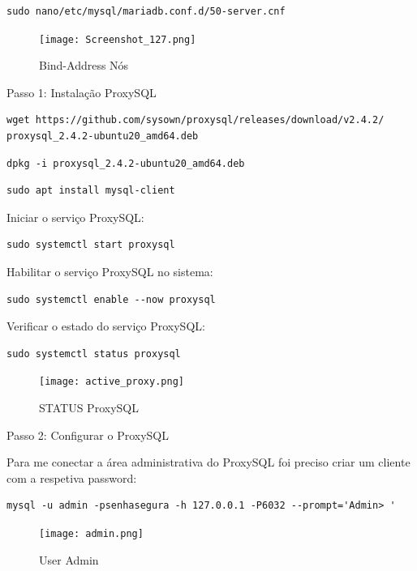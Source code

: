 \begin{verbatim}sudo nano/etc/mysql/mariadb.conf.d/50-server.cnf\end{verbatim}

\begin{figure}[H]
\center
\texttt{[image: Screenshot\_127.png]}
\caption{Bind-Address Nós}
\end{figure}

\hfill \break
\indent Passo 1: Instalação ProxySQL
\begin{verbatim}wget https://github.com/sysown/proxysql/releases/download/v2.4.2/
proxysql_2.4.2-ubuntu20_amd64.deb \end{verbatim}

\begin{verbatim}dpkg -i proxysql_2.4.2-ubuntu20_amd64.deb \end{verbatim}

\begin{verbatim}sudo apt install mysql-client\end{verbatim}

Iniciar o serviço ProxySQL:
\begin{verbatim}sudo systemctl start proxysql\end{verbatim}

Habilitar o serviço ProxySQL no sistema:
\begin{verbatim}sudo systemctl enable --now proxysql\end{verbatim}

\newpage
Verificar o estado do serviço ProxySQL:
\begin{verbatim}sudo systemctl status proxysql\end{verbatim}

\begin{figure}[H]
\center
\texttt{[image: active\_proxy.png]}
\caption{STATUS ProxySQL}
\end{figure}

\hfill \break
\indent Passo 2: Configurar o ProxySQL

\hfill \break
\indent Para me conectar a área administrativa do ProxySQL foi preciso criar um cliente com a respetiva password:

\begin{verbatim}mysql -u admin -psenhasegura -h 127.0.0.1 -P6032 --prompt='Admin> '\end{verbatim}

\begin{figure}[H]
\center
\texttt{[image: admin.png]}
\caption{User Admin}
\end{figure}

